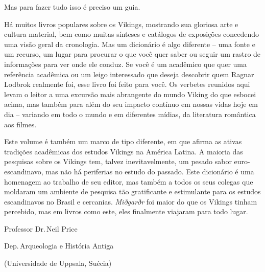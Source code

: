 Mas para fazer tudo isso é preciso um guia.

Há muitos livros populares sobre os Vikings, mostrando sua gloriosa arte
e cultura material, bem como muitas sínteses e catálogos de exposições
concedendo uma visão geral da cronologia. Mas um dicionário é algo
diferente -- uma fonte e um recurso, um lugar para procurar o que você
quer saber ou seguir um rastro de informações para ver onde ele conduz.
Se você é um acadêmico que quer uma referência acadêmica ou um leigo
interessado que deseja descobrir quem Ragnar Lodbrok realmente foi, esse
livro foi feito para você. Os verbetes reunidos aqui levam o leitor a
uma excursão mais abrangente do mundo Viking do que esbocei acima, mas
também para além do seu impacto contínuo em nossas vidas hoje em dia --
variando em todo o mundo e em diferentes mídias, da literatura romântica
aos filmes.

Este volume é também um marco de tipo diferente, em que afirma as ativas
tradições acadêmicas dos estudos Vikings na América Latina. A maioria das pesquisas sobre os Vikings tem, talvez inevitavelmente, um pesado sabor
euro-escandinavo, mas não há periferias no estudo do passado. Este
dicionário é uma homenagem ao trabalho de seu editor, mas também a todos os seus colegas que moldaram um ambiente de pesquisa tão gratificante e estimulante para os
estudos escandinavos no Brasil e cercanias. \emph{Miðgarðr} foi maior do
que os Vikings tinham percebido, mas em livros como este, eles
finalmente viajaram para todo lugar.\medskip

\EP[2]
\hfill Professor Dr.\,Neil Price

\hfill Dep.\,Arqueologia e História Antiga 

\hfill (Universidade de Uppsala, Suécia)
